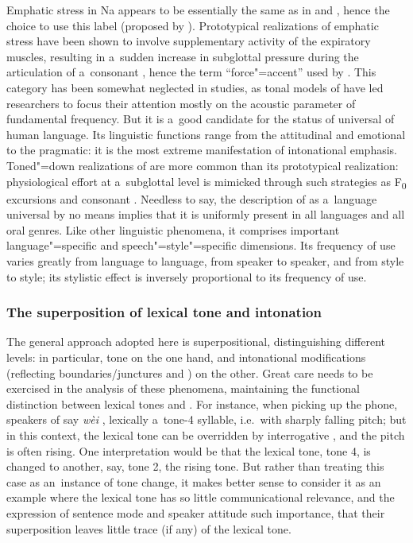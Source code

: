 Emphatic stress in Na appears to be essentially the same as in  and , hence the choice
to use this label (proposed by \citealt{coustenobleetal1937}). Prototypical realizations of emphatic
stress have been shown to involve supplementary activity of the expiratory muscles, resulting in
a~sudden increase in subglottal pressure during the articulation of a~consonant
\citep{benguerel1973,cartonetal1976,ohala1978,Fantetal1996}, hence the term “force"=accent” used by \citet{kohler2003}. This category has been somewhat neglected in  studies, as tonal models
of  have led researchers to focus their attention mostly on the acoustic parameter of
fundamental frequency. But it is a~good candidate for the status of universal of human language. Its
linguistic functions range from the attitudinal and emotional to the pragmatic: it is the most
extreme manifestation of intonational emphasis. Toned"=down realizations of  are more common than its prototypical realization: physiological effort at a~subglottal level is mimicked through such strategies as
F\textsubscript{0} excursions and consonant . Needless to say, the
description of  as a~language universal by no means implies that it is uniformly present in all
languages and all oral genres. Like other linguistic phenomena, it comprises important
language"=specific and speech"=style"=specific dimensions. Its frequency of use varies greatly from
language to language, from speaker to speaker, and from style to style; its stylistic effect is
inversely proportional to its frequency of use.


\subsubsection{The superposition of lexical tone and intonation}
\label{sec:thesuperpositionoflexicaltoneandintonation}


The general approach adopted here is superpositional, distinguishing different levels: in
particular, tone on the one hand, and intonational modifications (reflecting boundaries/junctures
and ) on the other. Great care needs to be exercised in the analysis of these
phenomena, maintaining the functional distinction between lexical tones and . For
instance, when picking up the phone, speakers of  say \textit{wèi} , lexically a~tone-4 syllable, i.e.\ with sharply falling pitch; but in this context,
the lexical tone can be overridden by interrogative , and the pitch is often rising. One
interpretation would be that the lexical tone, tone 4, is changed to another, say, tone 2, the rising
tone. But rather than treating this case as an~instance of tone change, it makes better sense to
consider it as an example where the lexical tone has so little communicational relevance,
and the expression of sentence mode and speaker attitude such importance, that their
superposition leaves little trace (if any) of the lexical tone.

